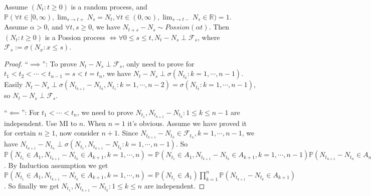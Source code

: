 \documentclass[../main]{subfiles}
\begin{document}
\begin{lemma}\label{lem:util}
  Assume \((N_t:t \geq 0)\) is a random process, and \(\mathbb{P}(\forall t \in [0,\infty),\lim_{s \to t+}N_s =N_t,\forall t \in (0,\infty),\lim_{s \to t-}N_s \in \mathbb{R})=1\).
  Assume \(\alpha >0\), and \(\forall t,s \geq 0\), we have \(N_{t + s}-N_s \sim Possion(\alpha t)\).
  Then \((N_t:t \geq 0)\) is a Possion process \(\iff \forall 0 \leq s \leq t,N_t-N_s \perp \mathcal{F}_s\),
  where \(\mathcal{F}_s:=\sigma(N_x:x \leq s)\).
\end{lemma}
\begin{proof}
  ``\(\implies\)'': To prove \(N_t-N_s \perp \mathcal{F}_s\), only need to prove for \(t_1 < t_2 < \cdots <t_{n-1}=s<t=t_n\), we have
  \(N_t-N_s \perp \sigma(N_{t_k}:k=1,\cdots,n-1)\).
  Easily \(N_t-N_s \perp \sigma(N_{t_{k+1}}-N_{t_k},N_{t_1}:k=1,\cdots,n-2)=\sigma(N_{t_k}:k=1,\cdots,n-1)\), so \(N_t-N_s \perp \mathcal{F}_s\).

  ``\(\impliedby\)'': For \(t_1 < \cdots < t_n\), we need to prove \(N_{t_1},N_{t_{k+1}}-N_{t_k}:1 \leq k \leq n-1\) are independent.
  Use MI to \(n\). When \(n=1\) it's obvious.
  Assume we have proved it for certain \(n \geq 1\), now consider \(n+1\).
  Since \(N_{t_{k+1}}-N_{t_k} \in \mathcal{F}_{t_n},k=1,\cdots,n-1\), we have \(N_{t_{n+1}}-N_{t_n} \perp \sigma(N_{t_1},N_{t_{k+1}}-N_{t_k}:k=1,\cdots,n-1)\).
  So \(\mathbb{P}(N_{t_1} \in A_1,N_{t_{k+1}}-N_{t_k} \in A_{k+1},k=1,\cdots,n)=\mathbb{P}(N_{t_1} \in A_1,N_{t_{k+1}}-N_{t_k} \in A_{k+1},k=1,\cdots,n-1)\mathbb{P}(N_{t_{n+1}}-N_{t_n} \in A_{n+1})\).
  By Induction assumption we get \(\mathbb{P}(N_{t_1} \in A_1,N_{t_{k+1}}-N_{t_k} \in A_{k+1},k=1,\cdots,n)=\mathbb{P}(N_{t_1}\in A_1) \prod_{k=1}^{n}\mathbb{P}(N_{t_{k+1}}-N_{t_k} \in A_{k+1})\).
  So finally we get \(N_{t_1},N_{t_{k+1}}-N_{t_k}:1 \leq k \leq n\) are independent.
\end{proof}
\end{document}
